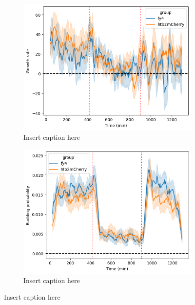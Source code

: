 \begin{figure}
  \centering
  \begin{subfigure}[htpb]{0.7\textwidth}
   \centering
   \includegraphics[width=\textwidth]{allstrains_19972_gr}
   \caption{
     Insert caption here
   }
   \label{fig:biology-starvation-gr}
  \end{subfigure}

  \begin{subfigure}[htpb]{0.7\textwidth}
   \centering
   \includegraphics[width=\textwidth]{allstrains_19972_budprob}
   \caption{
     Insert caption here
   }
   \label{fig:biology-starvation-budprob}
  \end{subfigure}

  \caption{
    Insert caption here
  }
  \label{fig:biology-starvation-gr-budprob}
\end{figure}



